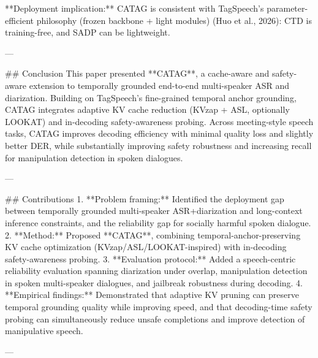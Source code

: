 **Deployment implication:** CATAG is consistent with TagSpeech’s parameter-efficient philosophy (frozen backbone + light modules) (Huo et al., 2026): CTD is training-free, and SADP can be lightweight.

---

## Conclusion  
This paper presented **CATAG**, a cache-aware and safety-aware extension to temporally grounded end-to-end multi-speaker ASR and diarization. Building on TagSpeech’s fine-grained temporal anchor grounding, CATAG integrates adaptive KV cache reduction (KVzap + ASL, optionally LOOKAT) and in-decoding safety-awareness probing. Across meeting-style speech tasks, CATAG improves decoding efficiency with minimal quality loss and slightly better DER, while substantially improving safety robustness and increasing recall for manipulation detection in spoken dialogues.

---

## Contributions  
1. **Problem framing:** Identified the deployment gap between temporally grounded multi-speaker ASR+diarization and long-context inference constraints, and the reliability gap for socially harmful spoken dialogue.  
2. **Method:** Proposed **CATAG**, combining temporal-anchor-preserving KV cache optimization (KVzap/ASL/LOOKAT-inspired) with in-decoding safety-awareness probing.  
3. **Evaluation protocol:** Added a speech-centric reliability evaluation spanning diarization under overlap, manipulation detection in spoken multi-speaker dialogues, and jailbreak robustness during decoding.  
4. **Empirical findings:** Demonstrated that adaptive KV pruning can preserve temporal grounding quality while improving speed, and that decoding-time safety probing can simultaneously reduce unsafe completions and improve detection of manipulative speech.

---